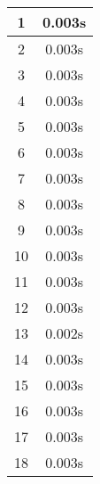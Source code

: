 \documentclass[11pt]{article}
\begin{document}
\begin{table}[!h]
\begin{center}
\begin{minipage}{0.48\textwidth}
\begin{tabular}{| c | c |}
				1 & 0.003s \\ \hline
				2 & 0.003s \\ \hline
				3 & 0.003s \\ \hline
				4 & 0.003s \\ \hline
				5 & 0.003s \\ \hline
				6 & 0.003s \\ \hline
				7 & 0.003s \\ \hline
				8 & 0.003s \\ \hline
				9 & 0.003s \\ \hline
				10 & 0.003s \\ \hline
				11 & 0.003s \\ \hline
				12 & 0.003s \\ \hline
				13 & 0.002s \\ \hline
				14 & 0.003s \\ \hline
				15 & 0.003s \\ \hline
				16 & 0.003s \\ \hline
				17 & 0.003s \\ \hline
				18 & 0.003s \\ \hline
			\end{tabular}
		\end{minipage}
	\end{center}
\end{table}

\pagebreak
\end{document}
